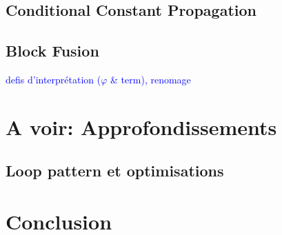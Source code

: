 \documentclass[11pt]{article}
\newcommand{\leon}[1]{\textcolor{blue}{#1}}
\begin{document}
\subsection{Conditional Constant Propagation}

\subsection{Block Fusion}

\leon{defis d'interprétation ($\varphi$ \& term), renomage}

\section{A voir: Approfondissements}

\subsection{Loop pattern et optimisations}

\section*{Conclusion}



\end{document}
